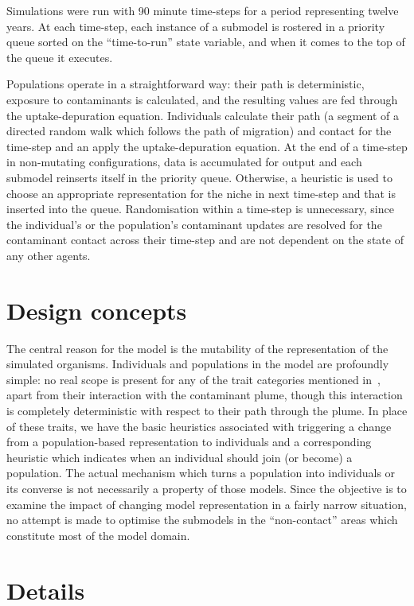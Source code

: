 Simulations were run with 90 minute time-steps for a period representing twelve
years. At each time-step, each instance of a submodel is rostered in a
priority queue sorted on the ``time-to-run'' state variable, and when it comes
to the top of the queue it executes.

Populations operate in a straightforward way: their path is deterministic,
exposure to contaminants is calculated, and the resulting values are fed
through the uptake-depuration equation. Individuals calculate their path (a
segment of a directed random walk which follows the path of migration) and
contact for the time-step and an apply the uptake-depuration equation. At the
end of a time-step in non-mutating configurations, data is accumulated for
output and each submodel reinserts itself in the priority queue. Otherwise, a
heuristic is used to choose an appropriate representation for the niche in
next time-step and that is inserted into the queue. Randomisation within a
time-step is unnecessary, since the individual's or the population's
contaminant updates are resolved for the contaminant contact across their
time-step and are not dependent on the state of any other agents.

\section{Design concepts}

The central reason for the model is the mutability of the representation of
the simulated organisms. Individuals and populations in the model are
profoundly simple: no real scope is present for any of the trait categories
mentioned in~\citet{Grimm06:1}, apart from their interaction with the
contaminant plume, though this interaction is completely deterministic with
respect to their path through the plume. In place of these traits, we have the
basic heuristics associated with triggering a change from a population-based
representation to individuals and a corresponding heuristic which indicates
when an individual should join (or become) a population. The actual mechanism
which turns a population into individuals or its converse is not necessarily a
property of those models. Since the objective is to examine the impact of
changing model representation in a fairly narrow situation, no attempt is made
to optimise the submodels in the ``non-contact'' areas which constitute most
of the model domain.


\section{Details}

